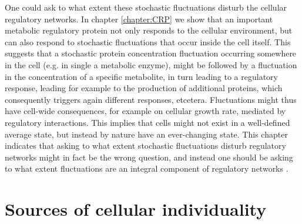 One could ask to what extent these stochastic fluctuations disturb the cellular regulatory networks.
%
In chapter \ref{chapter:CRP} we show that an important metabolic regulatory protein not only responds to the cellular environment,
but can also respond to stochastic fluctuations that occur inside the cell itself.
%
This suggests that a stochastic protein concentration fluctuation occurring somewhere in the cell (e.g. in single a metabolic enzyme),
might be followed by a fluctuation in the concentration of a specific metabolite, in turn leading to a regulatory response, 
leading for example to the production of additional proteins, which consequently triggers again different responses, etcetera.
%
Fluctuations might thus have cell-wide consequences, for example on cellular growth rate, mediated by regulatory interactions.
%
This implies that cells might not exist in a well-defined average state,
but instead by nature have an ever-changing state.
%
%
%
This chapter %
indicates that asking to what extent stochastic fluctuations disturb regulatory networks might in fact be the wrong question,
and instead one should be asking to what extent fluctuations are an integral component of regulatory networks \cite{Wollman2018}.

\section{Sources of cellular individuality}

